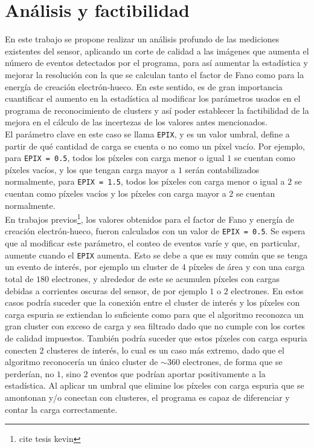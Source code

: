 \section{Análisis y factibilidad}
\noindent En este trabajo se propone realizar un análisis profundo de las mediciones existentes del sensor, aplicando un corte de calidad a las imágenes que aumenta el número de eventos detectados por el programa, para así aumentar la estadística y mejorar la resolución con la que se calculan tanto el factor de Fano como para la energía de creación electrón-hueco. %
En este sentido, es de gran importancia cuantificar el aumento en la estadística al modificar los parámetros usados en el programa de reconocimiento de clusters y así poder establecer la factibilidad de la mejora en el cálculo de las incertezas de los valores antes mencionados.\\
\indent El parámetro clave en este caso se llama \verb|EPIX|, y es un valor umbral, define a partir de qué cantidad de carga se cuenta o no como un píxel vacío. Por ejemplo, para \verb|EPIX = 0.5|, todos los píxeles con carga menor o igual $1$ se cuentan como píxeles vacíos, y los que tengan carga mayor a $1$ serán contabilizados normalmente, para \verb|EPIX = 1.5|, todos los píxeles con carga menor o igual a $2$ se cuentan como píxeles vacíos y los píxeles con carga mayor a $2$ se cuentan normalmente.\\
\indent En trabajos previos\footnote{cite tesis kevin}, los valores obtenidos para el factor de Fano y energía de creación electrón-hueco, fueron calculados con un valor de \verb|EPIX = 0.5|. Se espera que al modificar este parámetro, el conteo de eventos varíe y que, en particular, aumente cuando el \verb|EPIX| aumenta. Esto se debe a que es muy común que se tenga un evento de interés, por ejemplo un cluster de $4$ píxeles de área y con una carga total de $180$ electrones, y alrededor de este se acumulen píxeles con cargas debidas a corrientes oscuras del sensor, de por ejemplo $1$ o $2$ electrones. En estos casos podría suceder que la conexión entre el cluster de interés y los píxeles con carga espuria se extiendan lo suficiente como para que el algoritmo reconozca un gran cluster con exceso de carga y sea filtrado dado que no cumple con los cortes de calidad impuestos. También podría suceder que estos píxeles con carga espuria conecten $2$ clusteres de interés, lo cual es un caso más extremo, dado que el algoritmo reconocería un único cluster de $\sim 360$ electrones, de forma que se perderían, no $1$, sino $2$ eventos que podrían aportar positivamente a la estadística. Al aplicar un umbral que elimine los píxeles con carga espuria que se amontonan y/o conectan con clusteres, el programa es capaz de diferenciar y contar la carga correctamente.\\

